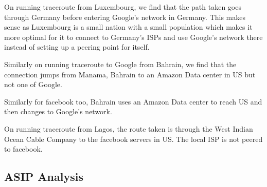 On running traceroute from Luxembourg, we find that the path taken goes through Germany before entering Google's network in Germany.
This makes sense as Luxembourg is a small nation with a small population which makes it more optimal for it to connect to Germany's 
ISPs and use Google's network there instead of setting up a peering point for itself.

Similarly on running traceroute to Google from Bahrain, we find that the connection jumps from Manama, Bahrain to  an Amazon Data 
center in US but not one of Google. 

Similarly for facebook too, Bahrain uses an Amazon Data center to reach US and then changes to Google's network.

On running traceroute from Lagos, the route taken is through the West Indian Ocean Cable Company to the facebook servers in US. The 
local ISP is not peered to facebook. 


\subsection*{ASIP Analysis}
